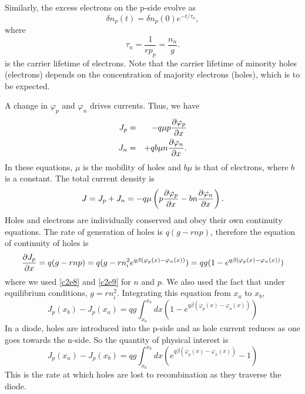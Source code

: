 Similarly, the excess electrons on the p-side evolve as 
\begin{equation}\label{c2e91}
\delta n_p(t) = \delta n_p(0) e^{-t/\tau_n},
\end{equation}
where
\begin{equation}\label{c2e92}
\tau_n = \frac{1}{rp_p} = \frac{n_n}{g}.
\end{equation}
is the carrier lifetime of electrons. Note that the carrier lifetime of minority
holes (electrons) depends on the concentration of majority electrons (holes),
which is to be expected.

A change in $\varphi_p$ and $\varphi_n$ drives currents. Thus, we have
\begin{eqnarray}
J_p &=& -q\mu p\frac{\partial{\varphi_p}}{\partial{x}} \label{c2e93}\\
J_n &=& +qb\mu n\frac{\partial{\varphi_n}}{\partial{x}}. \label{c2e94}
\end{eqnarray}
In these equations, $\mu$ is the mobility of holes and $b\mu$ is that of 
electrons, where $b$ is a constant. The total current density is
\begin{equation}\label{c2e95}
J = J_p + J_n = -q\mu\left(p\frac{\partial{\varphi_p}}{\partial{x}} - bn\frac{\partial{\varphi_n}}{\partial{x}}\right).
\end{equation}
Holes and electrons are individually conserved and obey their own continuity
equations. The rate of generation of holes is $q(g - rnp)$, therefore the
equation of continuity of holes is
\begin{equation}\label{c2e96}
\frac{\partial{J_p}}{\partial{x}} = q(g - rnp) = q(g - rn_i^2e^{q\beta(\varphi_p(x) - \varphi_n(x))})
= qg(1 - e^{q\beta(\varphi_p(x) - \varphi_n(x))})
\end{equation}
where we used \eqref{c2e8} and \eqref{c2e9} for $n$ and $p$. We also used the
fact that under equilibrium conditions, $g = rn_i^2$. Integrating this equation
from $x_a$ to $x_b$,
\[
J_p(x_b) - J_p(x_a) = qg\int_{x_a}^{x_b}dx\left(1 - e^{q\beta(\varphi_p(x) - 
\varphi_n(x))}\right)
\]
In a diode, holes are introduced into the p-side and as hole current reduces
as one goes towards the n-side. So the quantity of physical interest is
\begin{equation}\label{c2e97}
J_p(x_a) - J_p(x_b) = qg\int_{x_a}^{x_b}dx\left(e^{q\beta(\varphi_p(x) - 
\varphi_n(x))} - 1\right)
\end{equation}
This is the rate at which holes are lost to recombination as they traverse
the diode.

